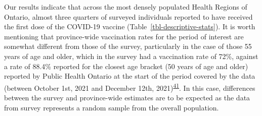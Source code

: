 \documentclass[
  letterpaper,
  DIV=11,
  numbers=noendperiod]{scrartcl}
\begin{document}
Our results indicate that across the most densely populated Health
Regions of Ontario, almost three quarters of surveyed individuals
reported to have received the first dose of the COVID-19 vaccine
(Table~\ref{tbl-descriptive-stats}). It is worth mentioning that
province-wide vaccination rates for the period of interest are somewhat
different from those of the survey, particularly in the case of those 55
years of age and older, which in the survey had a vaccination rate of
72\%, against a rate of 88.4\% reported for the closest age bracket (50
years of age and older) reported by Public Health Ontario at the start
of the period covered by the data (between October 1st, 2021 and
December 12th,
2021)\textsuperscript{\protect\hyperlink{ref-ontario-covid}{41}}. In
this case, differences between the survey and province-wide estimates
are to be expected as the data from survey represents a random sample
from the overall population.
\end{document}
